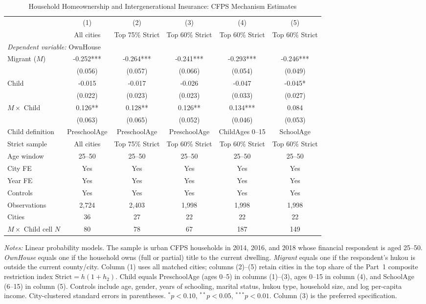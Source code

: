\begin{table}[htbp]
\centering
\caption{Household Homeownership and Intergenerational Insurance: CFPS Mechanism Estimates}
\label{tab:cfps_reg2_main}
\begin{threeparttable}
\begin{tabular}{lccccc}
\toprule
 & (1) & (2) & (3) & (4) & (5) \\
 & All cities & Top 75\% Strict & Top 60\% Strict & Top 60\% Strict & Top 60\% Strict \\
\midrule
\multicolumn{6}{l}{\textit{Dependent variable:} OwnHouse} \\
\midrule
Migrant ($M$) & -0.252*** & -0.264*** & -0.241*** & -0.293*** & -0.246*** \\
 & (0.056) & (0.057) & (0.066) & (0.054) & (0.049) \\
Child & -0.015 & -0.017 & -0.026 & -0.047 & -0.045* \\
 & (0.022) & (0.023) & (0.023) & (0.033) & (0.027) \\
$M \times$ Child & 0.126** & 0.128** & 0.126** & 0.134*** & 0.084 \\
 & (0.063) & (0.065) & (0.052) & (0.046) & (0.053) \\
\midrule
Child definition & PreschoolAge & PreschoolAge & PreschoolAge & ChildAges 0--15 & SchoolAge \\
Strict sample & All cities & Top 75\% Strict & Top 60\% Strict & Top 60\% Strict & Top 60\% Strict \\
Age window & 25--50 & 25--50 & 25--50 & 25--50 & 25--50 \\
City FE & Yes & Yes & Yes & Yes & Yes \\
Year FE & Yes & Yes & Yes & Yes & Yes \\
Controls & Yes & Yes & Yes & Yes & Yes \\
Observations & 2,724 & 2,403 & 1,998 & 1,998 & 1,998 \\
Cities & 36 & 27 & 22 & 22 & 22 \\
$M \times$ Child cell $N$ & 80 & 78 & 67 & 187 & 149 \\
\bottomrule
\end{tabular}
\begin{tablenotes}[flushleft]
\footnotesize
\item \textit{Notes:} Linear probability models. The sample is urban CFPS households in 2014, 2016, and 2018 whose financial respondent is aged 25--50. \textit{OwnHouse} equals one if the household owns (full or partial) title to the current dwelling. \textit{Migrant} equals one if the respondent's hukou is outside the current county/city. Column (1) uses all matched cities; columns (2)--(5) retain cities in the top share of the Part~1 composite restriction index $\mathrm{Strict}=h(1+h_2)$. Child equals PreschoolAge (ages 0--5) in columns (1)--(3), ages 0--15 in column (4), and SchoolAge (6--15) in column (5). Controls include age, gender, years of schooling, marital status, hukou type, household size, and log per-capita income. City-clustered standard errors in parentheses. $^{*}p<0.10$, $^{**}p<0.05$, $^{***}p<0.01$. Column (3) is the preferred specification.
\end{tablenotes}
\end{threeparttable}
\end{table}
